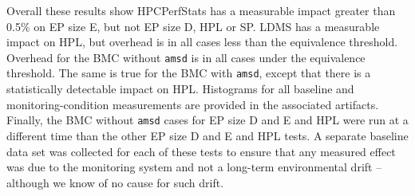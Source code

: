 \documentclass[conference]{IEEEtran}
\begin{document}
Overall these results show HPCPerfStats has a measurable impact greater than 0.5\% on EP size E, but not EP size D, HPL or SP.
LDMS has a measurable impact on HPL, but overhead is in all cases less 
than the equivalence threshold. Overhead for the BMC without \texttt{amsd} is
in all cases under the equivalence threshold. The same is true for the BMC with \texttt{amsd},
except that there is a statistically detectable impact on HPL.
Histograms for all baseline and monitoring-condition measurements are provided 
in the associated artifacts\cite{HPCNexusLabImpactofMonitoringonHPCWorkloads}.
Finally, the BMC without \texttt{amsd} cases for EP size D and E and HPL 
were run at a different time than the other EP size D and E and HPL tests. A 
separate baseline data set was collected for each of these tests to ensure that
any measured effect was due to the monitoring system and not a long-term 
environmental drift -- although we know of no cause for such drift.


\end{document}
